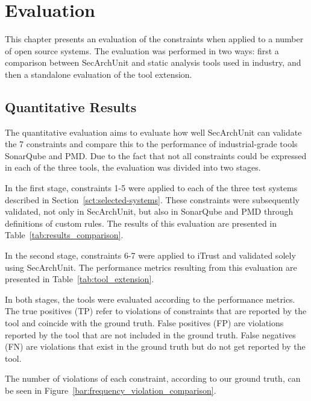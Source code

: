 \chapter{Evaluation}

This chapter presents an evaluation of the constraints when applied to a number of open source systems. The evaluation was performed in two ways: first a comparison between SecArchUnit and static analysis tools used in industry, and then a standalone evaluation of the tool extension.

\section{Quantitative Results}
The quantitative evaluation aims to evaluate how well SecArchUnit can validate the 7 constraints and compare this to the performance of industrial-grade tools SonarQube and PMD. Due to the fact that not all constraints could be expressed in each of the three tools, the evaluation was divided into two stages.

In the first stage, constraints 1-5 were applied to each of the three test systems described in Section~\ref{sct:selected-systems}. These constraints were subsequently validated, not only in SecArchUnit, but also in SonarQube and PMD through definitions of custom rules. The results of this evaluation are presented in Table~\ref{tab:results_comparison}.



In the second stage, constraints 6-7 were applied to iTrust and validated solely using SecArchUnit. The performance metrics resulting from this evaluation are presented in Table~\ref{tab:tool_extension}.



In both stages, the tools were evaluated according to the performance metrics. The true positives (TP) refer to violations of constraints that are reported by the tool and coincide with the ground truth. False positives (FP) are violations reported by the tool that are not included in the ground truth. False negatives (FN) are violations that exist in the ground truth but do not get reported by the tool. 

The number of violations of each constraint, according to our ground truth, can be seen in Figure~\ref{bar:frequency_violation_comparison}.






